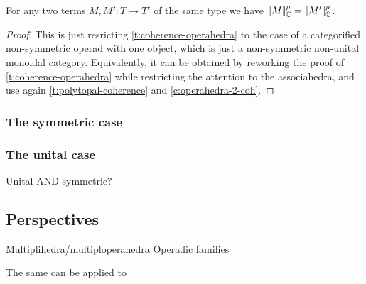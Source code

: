 \begin{corollary}
    For any two terms $M,M':T\rightarrow T'$  of the same type we have $[\![ M]\!]^\rho_{{\mathbb C}}=[\![ M']\!]^\rho_{{\mathbb C}}$.
\end{corollary}

\begin{proof}
    This is just resricting \cref{t:coherence-operahedra} to the case of a categorified non-symmetric operad with one object, which is just a non-symmetric non-unital monoidal category. 
    Equivalently, it can be obtained by reworking the proof of \cref{t:coherence-operahedra} while restricting the attention to the associahedra, and use again \cref{t:polytopal-coherence} and \cref{c:operahedra-2-coh}.
\end{proof}

\subsubsection{The symmetric case}

\subsubsection{The unital case}

Unital AND symmetric?

\subsection{Perspectives}

Multiplihedra/multiploperahedra
Operadic families



The same can be applied to 


